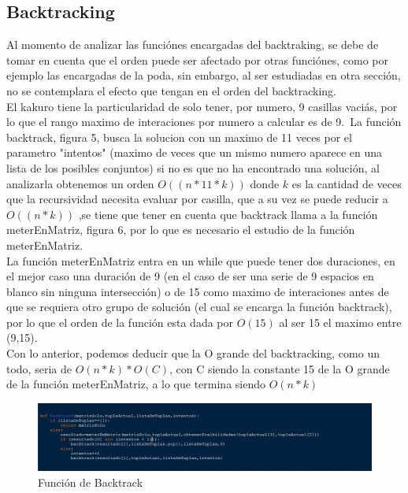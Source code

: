 \documentclass[journal]{IEEEtran}
\begin{document}
\subsection{Backtracking}
Al momento de analizar las funci\'{o}nes encargadas del backtraking, se debe de tomar en cuenta que el orden puede ser afectado por otras funci\'{o}nes, como por ejemplo las encargadas de la poda, sin embargo, al ser estudiadas en otra secci\'{o}n, no se contemplara el efecto que tengan en el orden del backtracking.\\
El kakuro tiene la particularidad de solo tener, por numero, 9 casillas vaci\'{a}s, por lo que el rango maximo de interaciones por numero a calcular es de 9.\ La funci\'{o}n backtrack, figura 5, busca la solucion con un maximo de 11 veces por el parametro "intentos" (maximo de veces que un mismo numero aparece en una lista de los posibles conjuntos) si no es que no ha encontrado una soluci\'{o}n, al analizarla obtenemos un orden $O((n*{11}*k))$ donde $k$ es la cantidad de veces que la recursividad necesita evaluar por casilla, que a su vez se puede reducir a  $O((n*k))$ ,se tiene que tener en cuenta que backtrack llama a la funci\'{o}n meterEnMatriz, figura 6, por lo que es necesario el estudio de la funci\'{o}n meterEnMatriz.
\\
La funci\'{o}n meterEnMatriz entra en un while que puede tener dos duraciones, en el mejor caso una duraci\'{o}n de 9 (en el caso de ser una serie de 9 espacios en blanco sin ninguna intersecci\'{o}n) o de 15 como maximo de interaciones antes de que se requiera otro grupo de soluci\'{o}n (el cual se encarga la funci\'{o}n backtrack), por lo que el orden de la funci\'{o}n esta dada por $O(15)$ al ser 15 el maximo entre (9,15).\\ Con lo anterior, podemos deducir que la O grande del backtracking, como un todo, seria de $O(n*k)*O(C)$, con C siendo la constante 15 de la O grande de la funci\'{o}n meterEnMatriz, a lo que termina siendo $O(n*k)$
\begin{figure}[h] 
	\centering \includegraphics[width=1\columnwidth]{backtrack_parte1.png}
	\caption{
		\label{fig:samplesetup}
		Función de Backtrack
	}
\end{figure}
\end{document}
